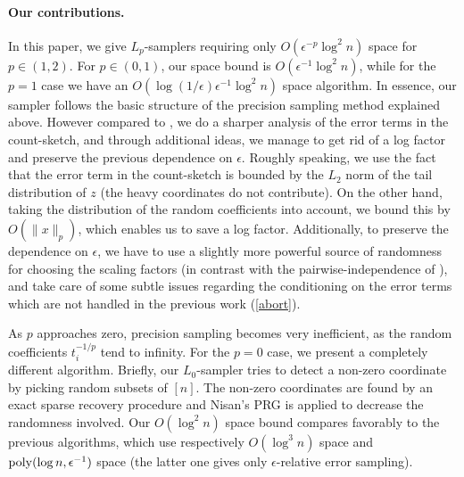 \paragraph{Our contributions.}
In this paper, we give $L_p$-samplers requiring only
$O(\epsilon^{-p}\log^2n)$ space for $p \in (1,2)$. For $p \in
(0,1)$, our space bound is $O(\epsilon^{-1}\log^2n)$, while for
the $p=1$ case we have an
$O(\log(1/\epsilon)\epsilon^{-1}\log^2n)$ space algorithm. In
essence, our sampler follows the basic structure of the
precision sampling method explained above. However compared to
\cite{AndoniKO2010}, we do a sharper analysis of the error terms
in the count-sketch, and through additional ideas, we manage to
get rid of a log factor and preserve the previous dependence on
$\epsilon$. Roughly speaking, we use the fact that the error
term in the count-sketch is bounded by the $L_2$ norm of the
tail distribution of $z$ (the heavy coordinates do not
contribute). On the other hand, taking the distribution of the
random coefficients into account, we bound this by $O(\|x\|_p)$,
which enables us to save a log factor. Additionally, to preserve
the dependence on $\epsilon$, we have to use a slightly more
powerful source of randomness for choosing the scaling factors
(in contrast with the pairwise-independence of
\cite{AndoniKO2010}), and take care of some subtle issues
regarding the conditioning on the error terms which are not
handled in the previous work (\autoref{abort}).
  
  
As $p$ approaches zero, precision sampling becomes very
inefficient, as the random coefficients $t_i^{-1/p}$ tend to
infinity. For the $p=0$ case, we present a completely different
algorithm. Briefly, our $L_0$-sampler tries to detect a non-zero
coordinate by picking random subsets of $[n]$. The non-zero
coordinates are found by an exact sparse recovery procedure and
Nisan's PRG \cite{Nisan1990} is applied to decrease the
randomness involved. Our $O(\log^2 n)$ space bound compares
favorably to the previous algorithms, which use respectively
$O(\log^3 n)$ space \cite{FrahlingIS2005} and 
$\operatorname{poly}(\log n,\epsilon^{-1})$ space \cite{MonemizadehW2010} 
(the latter one gives only $\epsilon$-relative error sampling).

